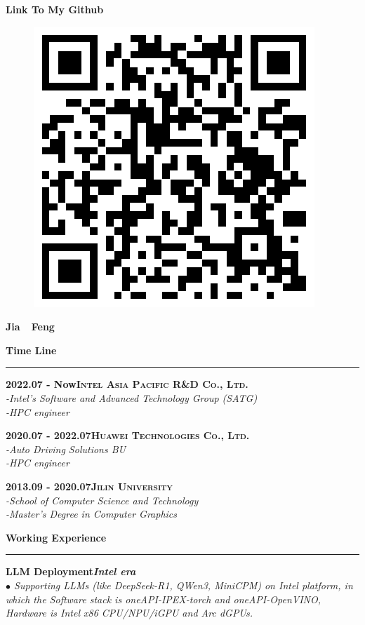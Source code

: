 \documentclass[a4paper,12pt,final]{memoir}
\newcommand{\myThemeColor}{RoyalBlue}
\newcommand{\SmallSep}{\vspace{0.9em}}
\newcommand{\CVSection}[1]
	{\Large\textbf{#1}\par
	\vspace{0.2cm}\normalsize\normalfont}
\newcommand{\CVItem}[1]
	{\textbf{\color{\myThemeColor} #1}}
\begin{document}
\begin{CJK*}{UTF8}{gbsn}
\begin{flushright}
	\SmallSep
	\SmallSep
	\SmallSep
	
	\CVItem{\large Link To My Github}
	\begin{figure}[h]
		\centering
		\includegraphics[width=0.8\columnwidth]{Github.png}
	\end{figure}
	

\end{flushright}\normalsize
\framebreak


\Huge\bfseries {\color{\myThemeColor} Jia~~Feng}\\
\normalsize\normalfont

\CVSection{Time Line}
\hrule
\SmallSep

\CVItem{2022.07 - Now\hfill\textsc{Intel Asia Pacific R\&D Co., Ltd.}}\\
\textit{-Intel's Software and Advanced Technology Group (SATG)}\\
\textit{-HPC engineer}

\CVItem{2020.07 - 2022.07\hfill\textsc{Huawei Technologies Co., Ltd.}}\\
\textit{-Auto Driving Solutions BU}\\
\textit{-HPC engineer}

\CVItem{2013.09 - 2020.07\hfill\textsc{Jilin University}}\\
\textit{-School of Computer Science and Technology}\\
\textit{-Master's Degree in Computer Graphics}

\CVSection{Working Experience}
\hrule
\SmallSep
\CVItem{LLM Deployment\hfill\emph{Intel era}}\\
\textit{$\bullet$ Supporting LLMs (like DeepSeek-R1, QWen3, MiniCPM) on Intel platform, in which the Software stack is oneAPI-IPEX-torch and oneAPI-OpenVINO, Hardware is Intel x86 CPU/NPU/iGPU and Arc dGPUs. }


\end{CJK*}
\end{document}
